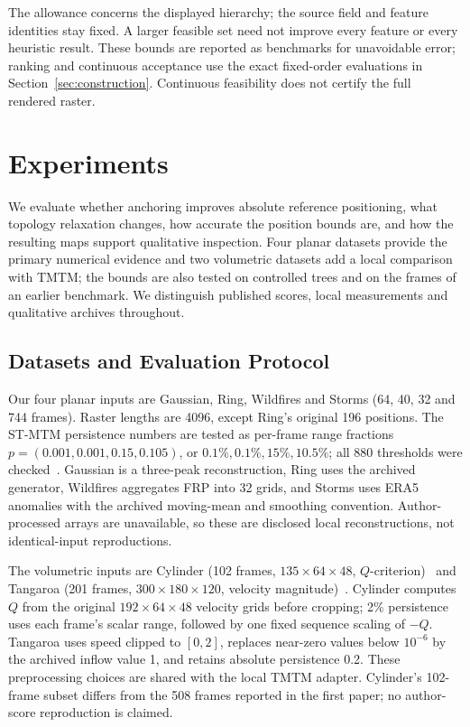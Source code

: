 \documentclass[review]{vgtc}
\begin{document}
The allowance concerns the displayed hierarchy; the source field and feature identities stay fixed. A larger feasible set need not improve every feature or every heuristic result. These bounds are reported as benchmarks for unavoidable error; ranking and continuous acceptance use the exact fixed-order evaluations in Section~\ref{sec:construction}. Continuous feasibility does not certify the full rendered raster.

\section{Experiments}\label{sec:experiments}
We evaluate whether anchoring improves absolute reference positioning, what topology relaxation changes, how accurate the position bounds are, and how the resulting maps support qualitative inspection. Four planar datasets provide the primary numerical evidence and two volumetric datasets add a local comparison with TMTM; the bounds are also tested on controlled trees and on the frames of an earlier benchmark. We distinguish published scores, local measurements and qualitative archives throughout.

\subsection{Datasets and Evaluation Protocol}
Our four planar inputs are Gaussian, Ring, Wildfires and Storms (64, 40, 32 and 744 frames). Raster lengths are 4096, except Ring's original 196 positions. The ST-MTM persistence numbers are tested as per-frame range fractions $p=(0.001,0.001,0.15,0.105)$, or $0.1\%,0.1\%,15\%,10.5\%$; all 880 thresholds were checked~\cite{STMTM:2026}. Gaussian is a three-peak reconstruction, Ring uses the archived generator, Wildfires aggregates FRP into 32 grids, and Storms uses ERA5 anomalies with the archived moving-mean and smoothing convention. Author-processed arrays are unavailable, so these are disclosed local reconstructions, not identical-input reproductions.

The volumetric inputs are Cylinder (102 frames, $135\times64\times48$, $Q$-criterion)~\cite{Camarri:2005:Cylinder,Weinkauf:SquareCylinder} and Tangaroa (201 frames, $300\times180\times120$, velocity magnitude)~\cite{Popinet:2004:Tangaroa}. Cylinder computes $Q$ from the original $192\times64\times48$ velocity grids before cropping; 2\% persistence uses each frame's scalar range, followed by one fixed sequence scaling of $-Q$. Tangaroa uses speed clipped to $[0,2]$, replaces near-zero values below $10^{-6}$ by the archived inflow value 1, and retains absolute persistence 0.2. These preprocessing choices are shared with the local TMTM adapter. Cylinder's 102-frame subset differs from the 508 frames reported in the first paper; no author-score reproduction is claimed.
\end{document}
